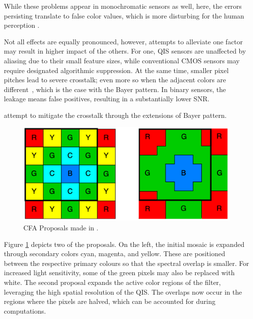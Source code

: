 While these problems appear in monochromatic sensors as well, here, the errors persisting translate to false color values, which is more disturbing for the human perception \cite{Hunt2005}.

Not all effects are equally pronounced, however, attempts to alleviate one factor may result in higher impact of the others. For one, QIS sensors are unaffected by aliasing due to their small feature sizes, while conventional CMOS sensors may require designated algorithmic suppression. At the same time, smaller pixel pitches lead to severe crosstalk; even more so when the adjacent colors are different~\cite{elgendy2019color}, which is the case with the Bayer pattern. In binary sensors, the leakage means false positives, resulting in a substantially lower SNR.

\cite{Anzagira2015ColorFA} attempt to mitigate the crosstalk through the extensions of Bayer pattern. 

\begin{figure}[h]
  \centering
  \includegraphics[width=0.7\linewidth]{imgs/cfa/cfaqis.png}
  \caption{CFA Proposals made in \cite{Anzagira2015ColorFA}.}
  \label{fig:cfaqis}
\end{figure}

Figure \ref{fig:cfaqis} depicts two of the proposals. On the left, the initial mosaic is expanded through secondary colors cyan, magenta, and yellow. These are positioned between the respective primary colours so that the spectral overlap is smaller. For increased light sensitivity, some of the green pixels may also be replaced with white. The second proposal expands the active color regions of the filter, leveraging the high spatial resolution of the QIS. The overlaps now occur in the regions where the pixels are halved, which can be accounted for during computations.


